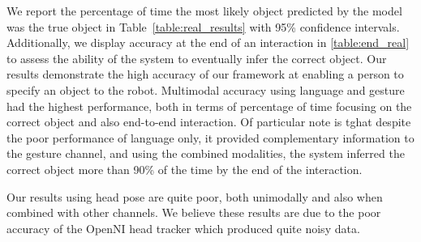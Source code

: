 \documentclass[letterpaper, 10 pt, conference]{ieeeconf}
\begin{document}
We report the percentage of time the most likely object predicted by
the model was the true object in Table~\ref{table:real_results} with
95\% confidence intervals. Additionally, we display accuracy at the
end of an interaction in \ref{table:end_real} to assess the ability of
the system to eventually infer the correct object.  Our results
demonstrate the high accuracy of our framework at enabling a person to
specify an object to the robot.  Multimodal accuracy using language
and gesture had the highest performance, both in terms of percentage
of time focusing on the correct object and also end-to-end
interaction.  Of particular note is tghat despite the poor performance
of language only, it provided complementary information to the gesture
channel, and using the combined modalities, the system inferred the
correct object more than 90\% of the time by the end of the
interaction.

Our results using head pose are quite poor, both unimodally and also
when combined with other channels.  We believe these results are due
to the poor accuracy of the OpenNI head tracker which produced quite
noisy data.
\end{document}
